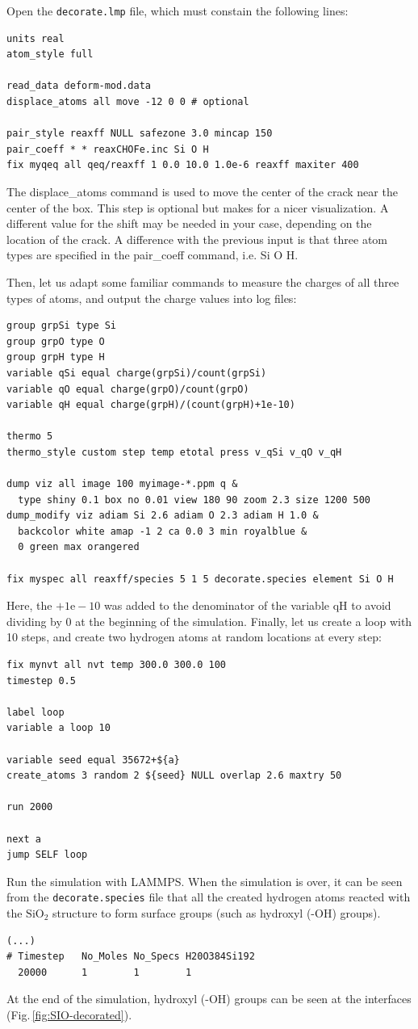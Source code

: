 \documentclass[9pt,tutorial]{livecoms}
\newcommand{\lmpcmd}[1]{\hspace{0pt}\colorbox{listing}{\textcolor{command}{\small{#1}}}\hspace{0pt}} %
\newcommand{\flecmd}[1]{\textcolor{command}{\texttt{#1}}} %
\begin{document}
Open the \flecmd{decorate.lmp} file, which must constain the following lines:
\begin{lstlisting}
units real
atom_style full

read_data deform-mod.data
displace_atoms all move -12 0 0 # optional

pair_style reaxff NULL safezone 3.0 mincap 150
pair_coeff * * reaxCHOFe.inc Si O H
fix myqeq all qeq/reaxff 1 0.0 10.0 1.0e-6 reaxff maxiter 400
\end{lstlisting}
The \lmpcmd{displace\_atoms} command is used to move the center of the
crack near the center of the box.  This step is optional but makes for a nicer
visualization.  A different value for the shift may be needed in
your case, depending on the location of the crack.  A difference with the previous
input is that three atom types are specified in the \lmpcmd{pair\_coeff} command, i.e.
\lmpcmd{Si O H}.

Then, let us adapt some familiar commands to measure the charges of all three
types of atoms, and output the charge values into log files:
\begin{lstlisting}
group grpSi type Si
group grpO type O
group grpH type H
variable qSi equal charge(grpSi)/count(grpSi)
variable qO equal charge(grpO)/count(grpO)
variable qH equal charge(grpH)/(count(grpH)+1e-10)

thermo 5
thermo_style custom step temp etotal press v_qSi v_qO v_qH

dump viz all image 100 myimage-*.ppm q &
  type shiny 0.1 box no 0.01 view 180 90 zoom 2.3 size 1200 500
dump_modify viz adiam Si 2.6 adiam O 2.3 adiam H 1.0 &
  backcolor white amap -1 2 ca 0.0 3 min royalblue &
  0 green max orangered

fix myspec all reaxff/species 5 1 5 decorate.species element Si O H
\end{lstlisting}
Here, the $+1\text{e}-10$ was added to the denominator of the \lmpcmd{variable qH}
to avoid dividing by 0 at the beginning of the simulation.  Finally, let us
create a loop with 10 steps, and create two hydrogen atoms at random locations at
every step:
\begin{lstlisting}
fix mynvt all nvt temp 300.0 300.0 100
timestep 0.5

label loop
variable a loop 10

variable seed equal 35672+${a}
create_atoms 3 random 2 ${seed} NULL overlap 2.6 maxtry 50

run 2000

next a
jump SELF loop
\end{lstlisting}
Run the simulation with LAMMPS.  When the simulation is over,
it can be seen from the \flecmd{decorate.species} file that
all the created hydrogen atoms reacted with the $\text{SiO}_{2}$ structure to
form surface groups (such as hydroxyl (-OH) groups).
\begin{lstlisting}
(...)
# Timestep   No_Moles No_Specs H20O384Si192
  20000      1        1        1
\end{lstlisting}
At the end of the simulation, hydroxyl (-OH) groups can be seen at the interfaces
(Fig.\,\ref{fig:SIO-decorated}).
\end{document}
